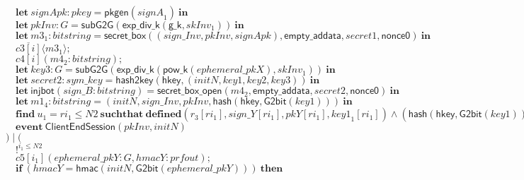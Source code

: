 \documentclass{article}
\newcommand{\cinput}[2]{{#1}({#2})}
\newcommand{\coutput}[2]{\overline{#1}\langle{#2}\rangle}
\newcommand{\kw}[1]{\mathbf{#1}}
\newcommand{\kwf}[1]{\mathsf{#1}}
\newcommand{\var}[1]{\mathit{#1}}
\newcommand{\kwt}[1]{\mathit{#1}}
\newcommand{\kwp}[1]{\mathit{#1}}
\newcommand{\kwc}[1]{\mathit{#1}}
\begin{document}
\begin{tabbing}
\>$\quad \kw{let}\ \var{signApk}: \kwt{pkey} = \kwf{pkgen}(\var{signA}_{1})\ \kw{in}$\\
\>$\quad \kw{let}\ \var{pkInv}: \kwt{G} = \kwf{subG2G}(\kwf{exp{\_}div{\_}k}(\kwf{g{\_}k}, \var{skInv}_{1}))\ \kw{in}$\\
\>$\quad \kw{let}\ \var{m3}_{1}: \kwt{bitstring} = \kwf{secret{\_}box}(\kwf{}(\var{sign{\_}Inv}, \var{pkInv}, \var{signApk}), \kwf{empty{\_}addata}, \var{secret1}, \kwf{nonce0})\ \kw{in}$\\
\>$\quad \coutput{\kwc{c3}[\var{i}]}{\var{m3}_{1}};$\\
\>$\quad \cinput{\kwc{c4}[\var{i}]}{\var{m4}_{2}: \kwt{bitstring}};$\\
\>$\quad \kw{let}\ \var{key3}: \kwt{G} = \kwf{subG2G}(\kwf{exp{\_}div{\_}k}(\kwf{pow{\_}k}(\var{ephemeral{\_}pkX}), \var{skInv}_{1}))\ \kw{in}$\\
\>$\quad \kw{let}\ \var{secret2}: \kwt{sym{\_}key} = \kwf{hash2key}(\kwf{hkey}, \kwf{}(\var{initN}, \var{key1}, \var{key2}, \var{key3}))\ \kw{in}$\\
\>$\quad \kw{let}\ \kwf{injbot}(\var{sign{\_}B}: \kwt{bitstring}) = \kwf{secret{\_}box{\_}open}(\var{m4}_{2}, \kwf{empty{\_}addata}, \var{secret2}, \kwf{nonce0})\ \kw{in}$\\
\>$\quad \kw{let}\ \var{m1}_{4}: \kwt{bitstring} = \kwf{}(\var{initN}, \var{sign{\_}Inv}, \var{pkInv}, \kwf{hash}(\kwf{hkey}, \kwf{G2bit}(\var{key1})))\ \kw{in}$\\
\>$\quad \kw{find}\ \var{u}_{1} = \var{ri}_{1} \leq \kwp{N2}\ \kw{suchthat}\ \kw{defined}(\var{r}_{3}[\var{ri}_{1}], \var{sign{\_}Y}[\var{ri}_{1}], \var{pkY}[\var{ri}_{1}], \var{key1}_{1}[\var{ri}_{1}])\wedge (\kwf{hash}(\kwf{hkey}, \kwf{G2bit}(\var{key1}))  =  \kwf{hash}(\kwf{hkey}, \kwf{G2bit}(\var{key1}_{1}[\var{ri}_{1}]))) \wedge  (\var{pkInv}  =  \var{pkY}[\var{ri}_{1}]) \wedge  (\var{sign{\_}Inv}  =  \var{sign{\_}Y}[\var{ri}_{1}]) \wedge  \kwf{check2}(\var{m1}_{4}, \kwf{pkgen2}(\var{signB}_{1}), \var{sign{\_}B})\ \kw{then}$\\
\>$\quad \kw{event}\ \kwf{ClientEndSession}(\var{pkInv}, \var{initN})$\\
\>$) \mid ($\\
\>$\quad !^{\var{i}_{1} \leq \kwp{N2}}$\\
\>$\quad \cinput{\kwc{c5}[\var{i}_{1}]}{\var{ephemeral{\_}pkY}: \kwt{G}, \var{hmacY}: \kwt{prfout}};$\\
\>$\quad \kw{if}\ (\var{hmacY}  =  \kwf{hmac}(\var{initN}, \kwf{G2bit}(\var{ephemeral{\_}pkY})))\ \kw{then}$\\

\end{tabbing}
\end{document}
